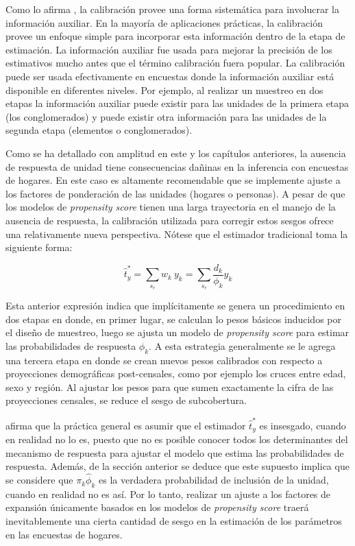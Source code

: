 \documentclass[
  12pt,
  spanish,
]{book}
\begin{document}
Como lo afirma \citet{Sar08}, la calibración provee una forma sistemática para involucrar la información auxiliar. En la mayoría de aplicaciones prácticas, la calibración provee un enfoque simple para incorporar esta información dentro de la etapa de estimación. La información auxiliar fue usada para mejorar la precisión de los estimativos mucho antes que el término calibración fuera popular. La calibración puede ser usada efectivamente en encuestas donde la información auxiliar está disponible en diferentes niveles. Por ejemplo, al realizar un muestreo en dos etapas la información auxiliar puede existir para las unidades de la primera etapa (los conglomerados) y puede existir otra información para las unidades de la segunda etapa (elementos o conglomerados).

Como se ha detallado con amplitud en este y los capítulos anteriores, la ausencia de respuesta de unidad tiene consecuencias dañinas en la inferencia con encuestas de hogares. En este caso es altamente recomendable que se implemente ajuste a los factores de ponderación de las unidades (hogares o personas). A pesar de que los modelos de \emph{propensity score} tienen una larga trayectoria en el manejo de la ausencia de respuesta, la calibración utilizada para corregir estos sesgos ofrece una relativamente nueva perspectiva. Nótese que el estimador tradicional toma la siguiente forma:

\[
\hat t_y^* = \sum_{s_r} w_k\ y_k = \sum_{s_r} \frac{d_k}{\phi_k} y_k 
\]

Esta anterior expresión indica que implícitamente se genera un procedimiento en dos etapas en donde, en primer lugar, se calculan lo pesos básicos inducidos por el diseño de muestreo, luego se ajusta un modelo de \emph{propensity score} para estimar las probabilidades de respuesta \(\phi_k\). A esta estrategia generalmente se le agrega una tercera etapa en donde se crean nuevos pesos calibrados con respecto a proyecciones demográficas post-censales, como por ejemplo los cruces entre edad, sexo y región. Al ajustar los pesos para que sumen exactamente la cifra de las proyecciones censales, se reduce el sesgo de subcobertura.

\citet{Sar08} afirma que la práctica general es asumir que el estimador \(\hat t_y^*\) es insesgado, cuando en realidad no lo es, puesto que no es posible conocer todos los determinantes del mecanismo de respuesta para ajustar el modelo que estima las probabilidades de respuesta. Además, de la sección anterior se deduce que este supuesto implica que se considere que \(\pi_k \hat\phi_k\) es la verdadera probabilidad de inclusión de la unidad, cuando en realidad no es así. Por lo tanto, realizar un ajuste a los factores de expansión únicamente basados en los modelos de \emph{propensity score} traerá inevitablemente una cierta cantidad de sesgo en la estimación de los parámetros en las encuestas de hogares.
\end{document}
